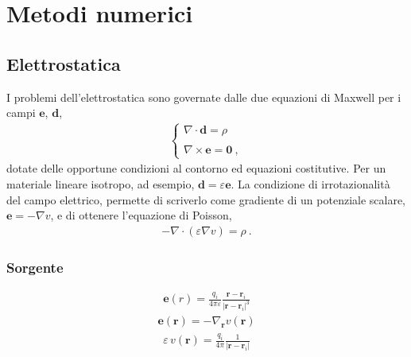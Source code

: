 \documentclass[letterpaper,10pt,english]{jupyterBook}
\begin{document}
\chapter{Metodi numerici}
\label{\detokenize{ch/numerical-methods:metodi-numerici}}\label{\detokenize{ch/numerical-methods:classical-electromagnetism-numerics}}\label{\detokenize{ch/numerical-methods::doc}}

\section{Elettrostatica}
\label{\detokenize{ch/numerical-methods:elettrostatica}}
\sphinxAtStartPar
I problemi dell’elettrostatica sono governate dalle due equazioni di Maxwell per i campi \(\mathbf{e}\), \(\mathbf{d}\),
\begin{equation*}
\begin{split}\begin{cases}
  \nabla \cdot \mathbf{d} = \rho \\ \\
  \nabla \times \mathbf{e} = \mathbf{0 \ ,}
\end{cases}\end{split}
\end{equation*}
\sphinxAtStartPar
dotate delle opportune condizioni al contorno ed equazioni costitutive. Per un materiale lineare isotropo, ad esempio, \(\mathbf{d} = \varepsilon \mathbf{e}\). La condizione di irrotazionalità del campo elettrico, permette di scriverlo come gradiente di un potenziale scalare, \(\mathbf{e} = - \nabla v\), e di ottenere l’equazione di Poisson,
\begin{equation*}
\begin{split}-\nabla \cdot (\varepsilon \nabla v ) = \rho \ .\end{split}
\end{equation*}

\subsection{Sorgente}
\label{\detokenize{ch/numerical-methods:sorgente}}\begin{equation*}
\begin{split}\mathbf{e}(r) = \frac{q_i}{4 \pi \varepsilon}\frac{\mathbf{r} - \mathbf{r}_i}{|\mathbf{r} - \mathbf{r}_i|^3}\end{split}
\end{equation*}\begin{equation*}
\begin{split}\mathbf{e}(\mathbf{r}) = - \nabla_{\mathbf{r}} v(\mathbf{r})\end{split}
\end{equation*}\begin{equation*}
\begin{split}\varepsilon \, v(\mathbf{r}) = \frac{q_i}{4 \pi}\frac{1}{|\mathbf{r} - \mathbf{r}_i|}\end{split}
\end{equation*}
\end{document}
